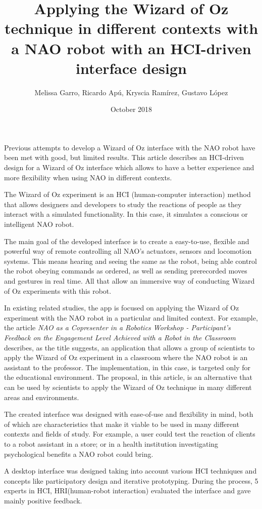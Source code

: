 \documentclass{article}
\title{Applying the Wizard of Oz technique in different contexts with a NAO robot with an HCI-driven interface design}
\author{Melissa Garro, Ricardo Apú, Kryscia Ramírez, Gustavo López}
\date{October 2018}
\begin{document}
    \maketitle

    Previous attempts to develop a Wizard of Oz interface with the NAO robot have been met with good, but limited results. This article describes an HCI-driven design for a Wizard of Oz interface which allows to have a better experience and more flexibility when using NAO in different contexts.\par
    The Wizard of Oz experiment is an HCI (human-computer interaction) method that allows designers and developers to study the reactions of people as they interact with a simulated functionality\cite{wofoz}. In this case, it simulates a conscious or intelligent NAO robot.\par
    The main goal of the developed interface is to create a easy-to-use, flexible and powerful way of remote controlling all NAO's actuators, sensors and locomotion systems. This means hearing and seeing the same as the robot, being able control the robot obeying commands as ordered, as well as sending prerecorded moves and gestures in real time. All that allow an immersive way of conducting Wizard of Oz experiments with this robot.\par
    In existing related studies, the app is focused on applying the Wizard of Oz experiment with the NAO robot in a particular and limited context. For example, the article \textit{NAO as a Copresenter in a Robotics Workshop - Participant’s Feedback on the Engagement Level Achieved with a Robot in the Classroom}\cite{joseiby} describes, as the title suggests, an application that allows a group of scientists to apply the Wizard of Oz experiment in a classroom where the NAO robot is an assistant to the professor. The implementation, in this case, is targeted only for the educational environment. The proposal, in this article, is an alternative that can be used by scientists to apply the Wizard of Oz technique in many different areas and environments.\par
    The created interface was designed with ease-of-use and flexibility in mind, both of which are characteristics that make it viable to be used in many different contexts and fields of study. For example, a user could test the reaction of clients to a robot assistant in a store; or in a health institution investigating psychological benefits a NAO robot could bring.\par
    A desktop interface was designed taking into account various HCI techniques and concepts like participatory design and iterative prototyping. During the process, 5 experts in HCI, HRI(human-robot interaction) evaluated the interface and gave mainly positive feedback.\par
    
\end{document}
